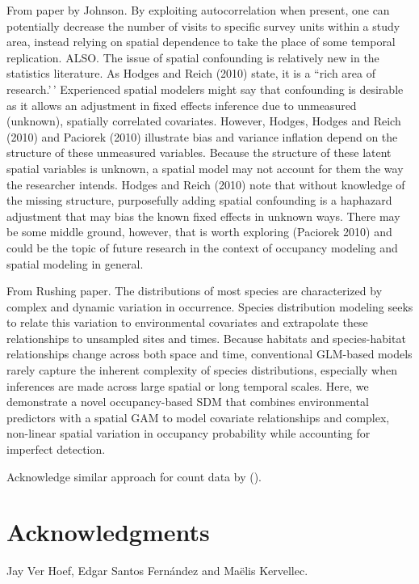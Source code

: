 \documentclass[
  11pt,
  a4paper,
]{article}
\begin{document}
From paper by Johnson. By exploiting autocorrelation when present, one can potentially decrease the number of visits to specific survey units
within a study area, instead relying on spatial dependence to take the place of some temporal replication.
ALSO. The issue of spatial confounding is relatively new in
the statistics literature. As Hodges and Reich (2010)
state, it is a ``rich area of research.'\,' Experienced spatial
modelers might say that confounding is desirable as it
allows an adjustment in fixed effects inference due to
unmeasured (unknown), spatially correlated covariates.
However, Hodges, Hodges and Reich (2010) and
Paciorek (2010) illustrate bias and variance inflation
depend on the structure of these unmeasured variables.
Because the structure of these latent spatial variables is
unknown, a spatial model may not account for them the
way the researcher intends. Hodges and Reich (2010)
note that without knowledge of the missing structure,
purposefully adding spatial confounding is a haphazard
adjustment that may bias the known fixed effects in
unknown ways. There may be some middle ground,
however, that is worth exploring (Paciorek 2010) and
could be the topic of future research in the context of
occupancy modeling and spatial modeling in general.

From Rushing paper. The distributions of most species are characterized by complex and dynamic variation in occurrence. Species distribution modeling seeks to relate this variation to environmental covariates and extrapolate these relationships to unsampled sites and times. Because habitats and species-habitat relationships change across both space and time, conventional GLM-based models rarely capture the inherent complexity of species distributions, especially when inferences are made across large spatial or long temporal scales. Here, we demonstrate a novel occupancy-based SDM that combines environmental predictors with a spatial GAM to model covariate relationships and complex, non-linear spatial variation in occupancy probability while accounting for imperfect detection.

Acknowledge similar approach for count data by ().

\section{Acknowledgments}\label{acknowledgments}

Jay Ver Hoef, Edgar Santos Fernández and Maëlis Kervellec.
\end{document}
